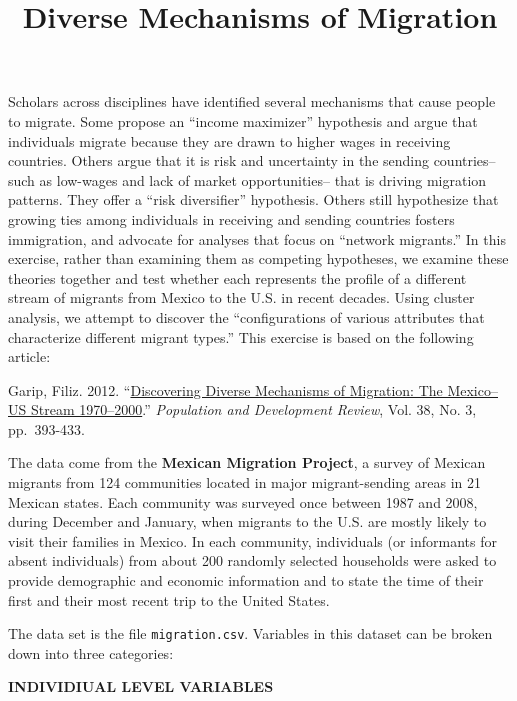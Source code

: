 \documentclass[]{article}
\title{Diverse Mechanisms of Migration}
\author{}
\date{}
\begin{document}
\maketitle


Scholars across disciplines have identified several mechanisms that
cause people to migrate. Some propose an ``income maximizer'' hypothesis
and argue that individuals migrate because they are drawn to higher
wages in receiving countries. Others argue that it is risk and
uncertainty in the sending countries--such as low-wages and lack of
market opportunities-- that is driving migration patterns. They offer a
``risk diversifier'' hypothesis. Others still hypothesize that growing
ties among individuals in receiving and sending countries fosters
immigration, and advocate for analyses that focus on ``network
migrants.'' In this exercise, rather than examining them as competing
hypotheses, we examine these theories together and test whether each
represents the profile of a different stream of migrants from Mexico to
the U.S. in recent decades. Using cluster analysis, we attempt to
discover the ``configurations of various attributes that characterize
different migrant types.'' This exercise is based on the following
article:

Garip, Filiz. 2012.
``\href{https://dx.doi.org/10.1111/j.1728-4457.2012.00510.x}{Discovering
Diverse Mechanisms of Migration: The Mexico--US Stream 1970--2000}.''
\emph{Population and Development Review}, Vol. 38, No. 3, pp.~393-433.

The data come from the \textbf{Mexican Migration Project}, a survey of
Mexican migrants from 124 communities located in major migrant-sending
areas in 21 Mexican states. Each community was surveyed once between
1987 and 2008, during December and January, when migrants to the U.S.
are mostly likely to visit their families in Mexico. In each community,
individuals (or informants for absent individuals) from about 200
randomly selected households were asked to provide demographic and
economic information and to state the time of their first and their most
recent trip to the United States.

The data set is the file \texttt{migration.csv}. Variables in this
dataset can be broken down into three categories:

\textbf{INDIVIDIUAL LEVEL VARIABLES}
\end{document}
